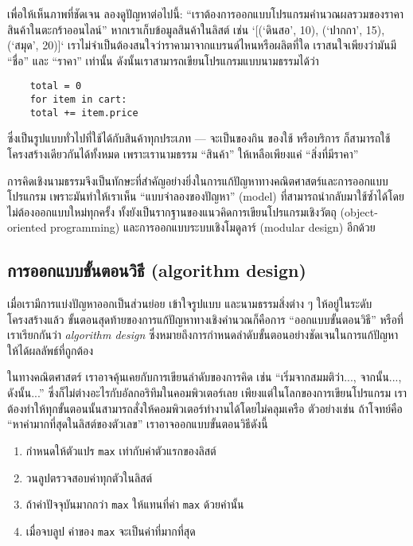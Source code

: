 เพื่อให้เห็นภาพที่ชัดเจน ลองดูปัญหาต่อไปนี้:  
“เราต้องการออกแบบโปรแกรมคำนวณผลรวมของราคาสินค้าในตะกร้าออนไลน์”  
หากเราเก็บข้อมูลสินค้าในลิสต์ เช่น `[(‘ดินสอ’, 10), (‘ปากกา’, 15), (‘สมุด’, 20)]` เราไม่จำเป็นต้องสนใจว่าราคามาจากแบรนด์ไหนหรือผลิตที่ใด เราสนใจเพียงว่ามันมี “ชื่อ” และ “ราคา” เท่านั้น ดังนั้นเราสามารถเขียนโปรแกรมแบบนามธรรมได้ว่า

\begin{verbatim}
	total = 0
	for item in cart:
	total += item.price
\end{verbatim}

ซึ่งเป็นรูปแบบทั่วไปที่ใช้ได้กับสินค้าทุกประเภท — จะเป็นของกิน ของใช้ หรือบริการ ก็สามารถใช้โครงสร้างเดียวกันได้ทั้งหมด เพราะเรานามธรรม “สินค้า” ให้เหลือเพียงแค่ “สิ่งที่มีราคา”

การคิดเชิงนามธรรมจึงเป็นทักษะที่สำคัญอย่างยิ่งในการแก้ปัญหาทางคณิตศาสตร์และการออกแบบโปรแกรม เพราะมันทำให้เราเห็น “แบบจำลองของปัญหา” (model) ที่สามารถนำกลับมาใช้ซ้ำได้โดยไม่ต้องออกแบบใหม่ทุกครั้ง ทั้งยังเป็นรากฐานของแนวคิดการเขียนโปรแกรมเชิงวัตถุ (object-oriented programming) และการออกแบบระบบเชิงโมดูลาร์ (modular design) อีกด้วย


\subsection{การออกแบบขั้นตอนวิธี (algorithm design)}
เมื่อเรามีการแบ่งปัญหาออกเป็นส่วนย่อย เข้าใจรูปแบบ และนามธรรมสิ่งต่าง ๆ ให้อยู่ในระดับโครงสร้างแล้ว ขั้นตอนสุดท้ายของการแก้ปัญหาทางเชิงคำนวณก็คือการ “ออกแบบขั้นตอนวิธี” หรือที่เราเรียกกันว่า \textit{algorithm design} ซึ่งหมายถึงการกำหนดลำดับขั้นตอนอย่างชัดเจนในการแก้ปัญหาให้ได้ผลลัพธ์ที่ถูกต้อง

ในทางคณิตศาสตร์ เราอาจคุ้นเคยกับการเขียนลำดับของการคิด เช่น “เริ่มจากสมมติว่า..., จากนั้น..., ดังนั้น...” ซึ่งก็ไม่ต่างอะไรกับอัลกอริทึมในคอมพิวเตอร์เลย เพียงแต่ในโลกของการเขียนโปรแกรม เราต้องทำให้ทุกขั้นตอนนั้นสามารถสั่งให้คอมพิวเตอร์ทำงานได้โดยไม่คลุมเครือ ตัวอย่างเช่น ถ้าโจทย์คือ “หาค่ามากที่สุดในลิสต์ของตัวเลข” เราอาจออกแบบขั้นตอนวิธีดังนี้

\begin{enumerate}
	\item กำหนดให้ตัวแปร \texttt{max} เท่ากับค่าตัวแรกของลิสต์
	\item วนลูปตรวจสอบค่าทุกตัวในลิสต์
	\item ถ้าค่าปัจจุบันมากกว่า \texttt{max} ให้แทนที่ค่า \texttt{max} ด้วยค่านั้น
	\item เมื่อจบลูป ค่าของ \texttt{max} จะเป็นค่าที่มากที่สุด
\end{enumerate}

